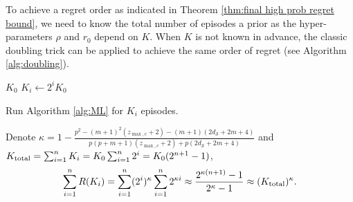 \documentclass[final,supplement]{siamart251216}
\begin{document}
\begin{remark}
\begin{table}[h!]
\centering
{}
\caption{Comparison of the regret orders.}
\label{table:regret}
\end{table}
\end{remark}


\iffalse

\begin{remark}

  To achieve a regret order %
  as indicated in Theorem \ref{thm:final high prob regret bound}, we need to know the total number of episodes a prior as the hyper-parameters $\rho$ and $r_0$ depend on $K$. When $K$ is not known in advance, the classic doubling trick \cite{besson2018doubling} can be applied to achieve the same order of regret (see Algorithm \ref{alg:doubling}).

\begin{algorithm}[H]
\caption{The Doubling Trick}\label{alg:doubling}
\begin{algorithmic}
  $K_0$
\State $K_i \leftarrow 2^i K_0$
\item Run Algorithm \ref{alg:ML} for $K_i$ episodes.
\EndFor
\end{algorithmic}
\end{algorithm}



Denote $\kappa = 1-\frac{p^{2}-(m+1)^{2}(z_{\max,c}+2)-(m+1)(2d_{\mathcal{S}}+2m+4)}{p(p+m+1)(z_{\max,c}+2)+p(2d_{\mathcal{S}}+2m+4)}$ and $K_{\rm total} = \sum_{i=1}^n K_i = K_0\sum_{i=1}^n 2^i= K_0 (2^{n+1}-1)$,
\begin{eqnarray}
    \sum_{i=1}^n R(K_i) = \sum_{i=1}^n (2^i)^\kappa \sum_{i=1}^n 2^{\kappa i }\approx \frac{2^{\kappa(n+1) }-1}{2^\kappa-1}\approx (K_{\rm total})^\kappa.
\end{eqnarray}

\end{remark}
\end{document}
